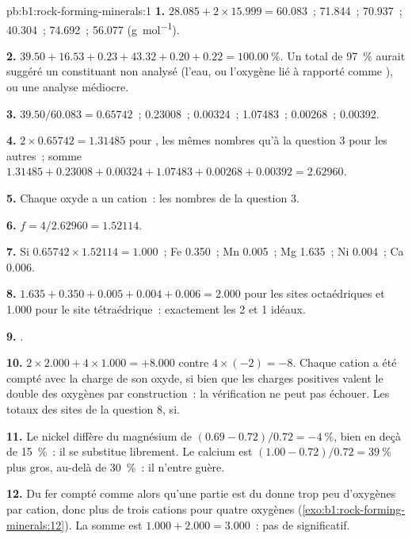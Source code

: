 \begin{solution}{pb:b1:rock-forming-minerals:1}
\textbf{1.}  $28.085 + 2\times15.999 = 60.083$~;  71.844~;
 70.937~;  40.304~;  74.692~;  56.077
(\si{g.mol^{-1}}).

\textbf{2.} $39.50 + 16.53 + 0.23 + 43.32 + 0.20 + 0.22 =
\qty{100.00}{\percent}$. Un total de \qty{97}{\percent} aurait suggéré un
constituant non analysé (l'eau, ou l'oxygène lié à  rapporté comme
), ou une analyse médiocre.

\textbf{3.}  $39.50/60.083 = 0.65742$~;  0.23008~; 
0.00324~;  1.07483~;  0.00268~;  0.00392.

\textbf{4.} $2\times0.65742 = 1.31485$ pour , les mêmes nombres qu'à la
question 3 pour les autres~; somme $1.31485 + 0.23008 + 0.00324 + 1.07483 +
0.00268 + 0.00392 = 2.62960$.

\textbf{5.} Chaque oxyde a un cation~: les nombres de la question 3.

\textbf{6.} $f = 4/2.62960 = 1.52114$.

\textbf{7.} Si $0.65742\times1.52114 = 1.000$~; Fe 0.350~; Mn 0.005~; Mg 1.635~;
Ni 0.004~; Ca 0.006.

\textbf{8.} $1.635 + 0.350 + 0.005 + 0.004 + 0.006 = 2.000$ pour les sites
octaédriques et 1.000 pour le site tétraédrique~: exactement les 2 et 1 idéaux.

\textbf{9.} .

\textbf{10.} $2\times2.000 + 4\times1.000 = +8.000$ contre $4\times(-2) =
-8$. Chaque cation a été compté avec la charge de son oxyde, si bien que les
charges positives valent le double des oxygènes par construction~: la
vérification ne peut pas échouer. Les totaux des sites de la question 8, si.

\textbf{11.} Le nickel diffère du magnésium de
$(0.69 - 0.72)/0.72 = -\qty{4}{\percent}$, bien en deçà de \qty{15}{\percent}~:
il se substitue librement. Le calcium est $(1.00 - 0.72)/0.72 = \qty{39}{\percent}$
plus gros, au-delà de \qty{30}{\percent}~: il n'entre guère.

\textbf{12.} Du fer compté comme  alors qu'une partie est du 
donne trop peu d'oxygènes par cation, donc plus de trois cations pour quatre
oxygènes (\cref{exo:b1:rock-forming-minerals:12}). La somme est
$1.000 + 2.000 = 3.000$~: pas de  significatif.


\end{solution}
